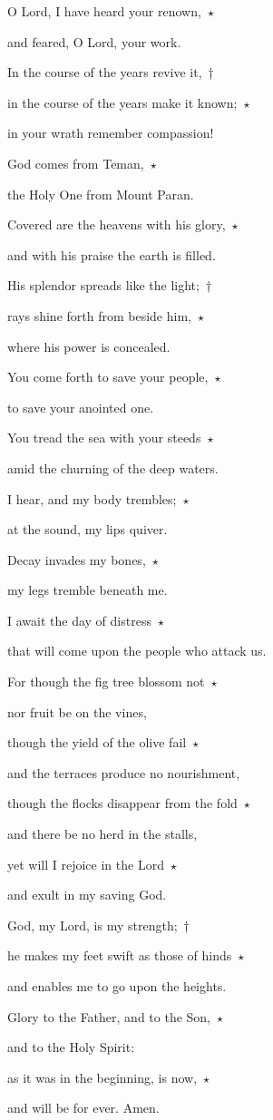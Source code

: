 \noindent O Lord, I have heard your renown,~$\star$~\nopagebreak

and feared, O Lord, your work.

\noindent In the course of the years revive it,~†~\nopagebreak

in the course of the years make it known;~$\star$~\nopagebreak

in your wrath remember compassion!

\noindent God comes from Teman,~$\star$~\nopagebreak

the Holy One from Mount Paran.

\noindent Covered are the heavens with his glory,~$\star$~\nopagebreak

and with his praise the earth is filled.

\noindent His splendor spreads like the light;~†~\nopagebreak

rays shine forth from beside him,~$\star$~\nopagebreak

where his power is concealed.

\noindent You come forth to save your people,~$\star$~\nopagebreak

to save your anointed one.

\noindent You tread the sea with your steeds~$\star$~\nopagebreak

amid the churning of the deep waters.

\noindent I hear, and my body trembles;~$\star$~\nopagebreak

at the sound, my lips quiver.

\noindent Decay invades my bones,~$\star$~\nopagebreak

my legs tremble beneath me.

\noindent I await the day of distress~$\star$~\nopagebreak

that will come upon the people who attack us.

\noindent For though the fig tree blossom not~$\star$~\nopagebreak

nor fruit be on the vines,

\noindent though the yield of the olive fail~$\star$~\nopagebreak

and the terraces produce no nourishment,

\noindent though the flocks disappear from the fold~$\star$~\nopagebreak

and there be no herd in the stalls,

\noindent yet will I rejoice in the Lord~$\star$~\nopagebreak

and exult in my saving God.

\noindent God, my Lord, is my strength;~†~\nopagebreak

he makes my feet swift as those of hinds~$\star$~\nopagebreak

and enables me to go upon the heights.

\noindent Glory to the Father, and to the Son,~$\star$~\nopagebreak

and to the Holy Spirit:

\noindent as it was in the beginning, is now,~$\star$~\nopagebreak

and will be for ever. Amen.